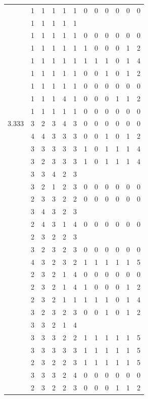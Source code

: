\documentclass[]{msu-thesis}
\theoremstyle{definition}
\theoremstyle{definition}
\theoremstyle{definition}
\theoremstyle{remark}
\begin{document}
\begin{table}
{\begin{tabular}[t]{rrrrrrrrrrrr}
 & 1 & 1 & 1 & 1 & 1 & 0 & 0 & 0 & 0 & 0 & 0\\
 & 1 & 1 & 1 & 1 & 1 &  &  &  &  &  & \\
 & 1 & 1 & 1 & 1 & 1 & 0 & 0 & 0 & 0 & 0 & 0\\
 & 1 & 1 & 1 & 1 & 1 & 1 & 0 & 0 & 0 & 1 & 2\\
 & 1 & 1 & 1 & 1 & 1 & 1 & 1 & 1 & 0 & 1 & 4\\
 & 1 & 1 & 1 & 1 & 1 & 0 & 0 & 1 & 0 & 1 & 2\\
 & 1 & 1 & 1 & 1 & 1 & 0 & 0 & 0 & 0 & 0 & 0\\
 & 1 & 1 & 1 & 4 & 1 & 0 & 0 & 0 & 1 & 1 & 2\\
 & 1 & 1 & 1 & 1 & 1 & 0 & 0 & 0 & 0 & 0 & 0\\
3.333 & 3 & 2 & 3 & 4 & 3 & 0 & 0 & 0 & 0 & 0 & 0\\
 & 4 & 4 & 3 & 3 & 3 & 0 & 0 & 1 & 0 & 1 & 2\\
 & 3 & 3 & 3 & 3 & 3 & 1 & 0 & 1 & 1 & 1 & 4\\
 & 3 & 2 & 3 & 3 & 3 & 1 & 0 & 1 & 1 & 1 & 4\\
 & 3 & 3 & 4 & 2 & 3 &  &  &  &  &  & \\
 & 3 & 2 & 1 & 2 & 3 & 0 & 0 & 0 & 0 & 0 & 0\\
 & 2 & 3 & 3 & 2 & 2 & 0 & 0 & 0 & 0 & 0 & 0\\
 & 3 & 4 & 3 & 2 & 3 &  &  &  &  &  & \\
 & 2 & 4 & 3 & 1 & 4 & 0 & 0 & 0 & 0 & 0 & 0\\
 & 2 & 3 & 2 & 2 & 3 &  &  &  &  &  & \\
 & 3 & 2 & 3 & 2 & 3 & 0 & 0 & 0 & 0 & 0 & 0\\
 & 4 & 3 & 2 & 3 & 2 & 1 & 1 & 1 & 1 & 1 & 5\\
 & 2 & 3 & 2 & 1 & 4 & 0 & 0 & 0 & 0 & 0 & 0\\
 & 2 & 3 & 2 & 1 & 4 & 1 & 0 & 0 & 0 & 1 & 2\\
 & 2 & 3 & 2 & 1 & 1 & 1 & 1 & 1 & 0 & 1 & 4\\
 & 3 & 2 & 3 & 2 & 3 & 0 & 0 & 1 & 0 & 1 & 2\\
 & 3 & 3 & 2 & 1 & 4 &  &  &  &  &  & \\
 & 3 & 3 & 3 & 2 & 2 & 1 & 1 & 1 & 1 & 1 & 5\\
 & 3 & 3 & 3 & 3 & 3 & 1 & 1 & 1 & 1 & 1 & 5\\
 & 2 & 3 & 2 & 2 & 3 & 1 & 1 & 1 & 1 & 1 & 5\\
 & 3 & 3 & 3 & 2 & 4 & 0 & 0 & 0 & 0 & 0 & 0\\
 & 2 & 3 & 2 & 2 & 3 & 0 & 0 & 0 & 1 & 1 & 2\\

\end{tabular}}
\end{table}
\end{document}
